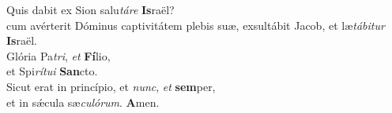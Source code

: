 \oddverse Quis dabit ex Sion salu\textit{tá}\textit{re} \textbf{Is}raël?~\*\\
\oddverse cum avérterit Dóminus captivitátem plebis suæ, exsultábit Jacob, et læ\textit{tá}\textit{bi}\textit{tur} \textbf{Is}raël.\\
\evenverse Glória Pa\textit{tri}, \textit{et} \textbf{Fí}lio,~\*\\
\evenverse et Spi\textit{rí}\textit{tu}\textit{i} \textbf{San}cto.\\
\oddverse Sicut erat in princípio, et \textit{nunc}, \textit{et} \textbf{sem}per,~\*\\
\oddverse et in sǽcula sæ\textit{cu}\textit{ló}\textit{rum}. \textbf{A}men.\\
